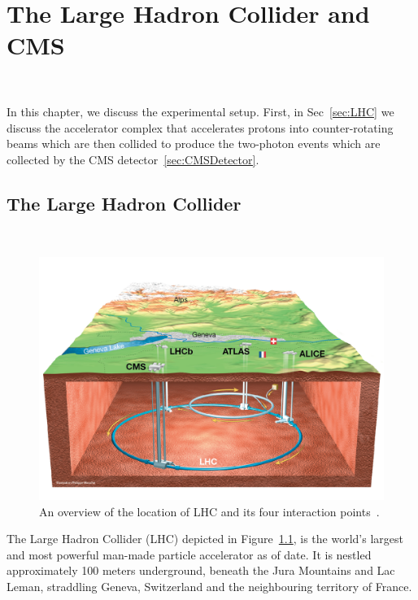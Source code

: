 \chapter{The Large Hadron Collider and CMS}~\label{ch:CMSExperiment}

{\small {}
\vspace{-2ex}
}
\vspace{4ex}

In this chapter, we discuss the experimental setup. First, in Sec~\ref{sec:LHC} we discuss the accelerator complex that accelerates protons into counter-rotating beams which are then collided to produce the two-photon events which are collected by the CMS detector~\ref{sec:CMSDetector}. 

\section{The Large Hadron Collider}~\label{sec:LHC}
\begin{figure}[!htb]
	\centering
	\includegraphics[scale=0.3]{fig/lhc_overview.png}
	\caption{An overview of the location of LHC and its four interaction points~\cite{Mouche:1708847}.}
	\label{lhc-overview}
\end{figure}


\justifying \parindent=25pt


The Large Hadron Collider (LHC) depicted in Figure~\ref{lhc-overview}, is the world's largest and most powerful man-made particle accelerator as of date. It is nestled approximately 100 meters underground, beneath the Jura Mountains and Lac Leman, straddling Geneva, Switzerland and the neighbouring territory of France.


